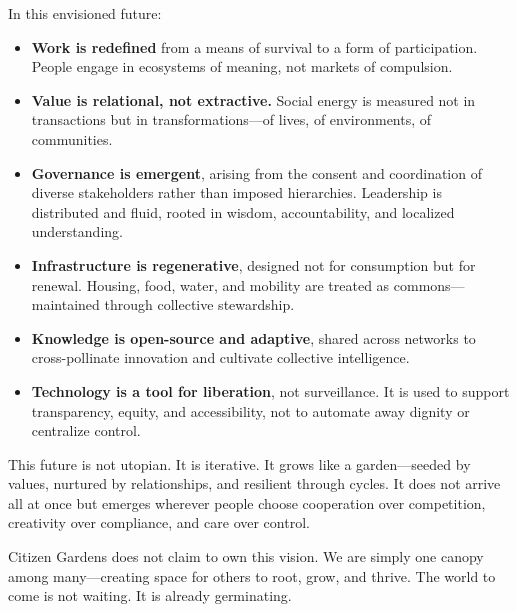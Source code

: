 \documentclass[12pt]{article}
\begin{document}
In this envisioned future:

\begin{itemize}
    \item \textbf{Work is redefined} from a means of survival to a form of participation. People engage in ecosystems of meaning, not markets of compulsion.
    \item \textbf{Value is relational, not extractive.} Social energy is measured not in transactions but in transformations—of lives, of environments, of communities.
    \item \textbf{Governance is emergent}, arising from the consent and coordination of diverse stakeholders rather than imposed hierarchies. Leadership is distributed and fluid, rooted in wisdom, accountability, and localized understanding.
    \item \textbf{Infrastructure is regenerative}, designed not for consumption but for renewal. Housing, food, water, and mobility are treated as commons—maintained through collective stewardship.
    \item \textbf{Knowledge is open-source and adaptive}, shared across networks to cross-pollinate innovation and cultivate collective intelligence.
    \item \textbf{Technology is a tool for liberation}, not surveillance. It is used to support transparency, equity, and accessibility, not to automate away dignity or centralize control.
\end{itemize}

This future is not utopian. It is iterative. It grows like a garden—seeded by values, nurtured by relationships, and resilient through cycles. It does not arrive all at once but emerges wherever people choose cooperation over competition, creativity over compliance, and care over control.

Citizen Gardens does not claim to own this vision. We are simply one canopy among many—creating space for others to root, grow, and thrive. The world to come is not waiting. It is already germinating.
\end{document}
